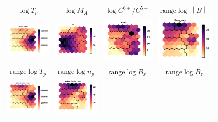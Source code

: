 \documentclass[utf8]{frontiersSCNS} %
\begin{document}
\begin{figure}[h!]
\begin{tabular}{CCCC}
		\\
		$\log T_p$ & $\log M_A$ & $\log C^{6+}/C^{5+}$ & $\text{range} \log \left\lVert B \right\rVert $ \\
		\includegraphics[width=4cm]{Amaya/comp-map-log_proton_temp} &
		\includegraphics[width=4cm]{Amaya/comp-map-log_Ma} &
		\includegraphics[width=4cm]{Amaya/comp-map-log_C6to5} &
		\includegraphics[width=4cm]{Amaya/comp-map-log_Bmag_range}\hfill
		\\
		$\text{range} \log T_p $ & $\text{range} \log n_p$ & $\text{range} \log B_x$ & $\text{range} \log B_z$ \\
		\includegraphics[width=4cm]{Amaya/comp-map-log_proton_temp_range} &
		\includegraphics[width=4cm]{Amaya/comp-map-log_proton_density_range} &

\end{tabular}
\end{figure}
\end{document}

